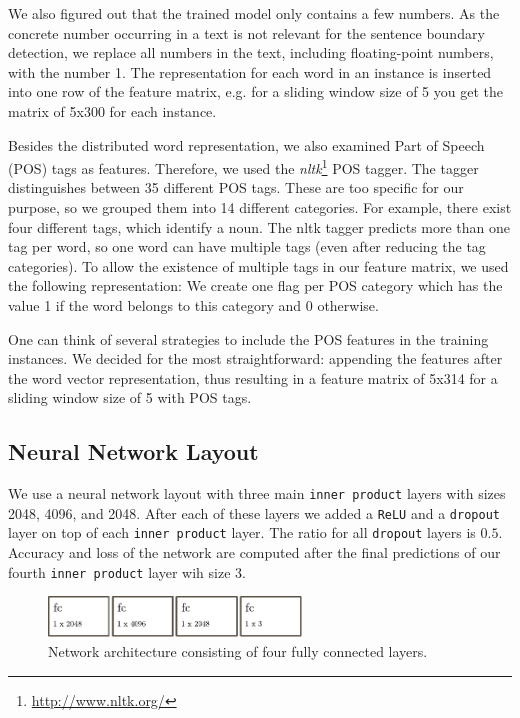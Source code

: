 We also figured out that the trained model only contains a few numbers.
As the concrete number occurring in a text is not relevant for the sentence boundary detection, we replace all numbers in the text, including floating-point numbers, with the number 1.
The representation for each word in an instance is inserted into one row of the feature matrix, e.g. for a sliding window size of 5 you get the matrix of 5x300 for each instance.

Besides the distributed word representation, we also examined Part of Speech (POS) tags as features.
Therefore, we used the \emph{nltk}\footnote{\url{http://www.nltk.org/}} POS tagger.
The tagger distinguishes between 35 different POS tags.
These are too specific for our purpose, so we grouped them into 14 different categories.
For example, there exist four different tags, which identify a noun.
The nltk tagger predicts more than one tag per word, so one word can have multiple tags (even after reducing the tag categories).
To allow the existence of multiple tags in our feature matrix, we used the following representation:
We create one flag per POS category which has the value 1 if the word belongs to this category and 0 otherwise.

One can think of several strategies to include the POS features in the training instances.
We decided for the most straightforward: appending the features after the word vector representation, thus resulting in a feature matrix of 5x314 for a sliding window size of 5 with POS tags.



\subsection{Neural Network Layout}

We use a neural network layout with three main \texttt{inner product} layers with sizes 2048, 4096, and 2048.
After each of these layers we added a \texttt{ReLU} and a \texttt{dropout} layer on top of each \texttt{inner product} layer.
The ratio for all \texttt{dropout} layers is $0.5$.
Accuracy and loss of the network are computed after the final predictions of our fourth \texttt{inner product} layer wih size 3.

\begin{figure}[ht]
    \centering
    \includegraphics[width=0.6\textwidth]{img/net_lexical.pdf}
    \caption{Network architecture consisting of four fully connected layers.}
    \label{fig:net_lexical}
\end{figure}

